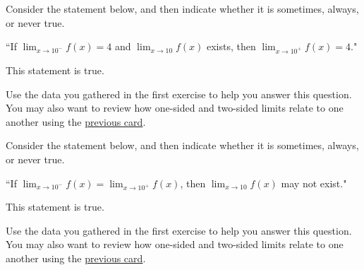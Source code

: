 \documentclass[handout]{ximera}
\begin{document}
\begin{exercise}

Consider the statement below, and then indicate whether it is sometimes, always, or never true.

\begin{center} ``If $\displaystyle\lim_{x\to 10^-} f(x) = 4$ and $\displaystyle\lim_{x\to 10} f(x)$ exists, then $\displaystyle\lim_{x\to 10^+} f(x) = 4.$" \end{center}

This statement is  true.

\begin{hint}

Use the data you gathered in the first exercise to help you answer this question.  You may also want to review how one-sided and two-sided limits relate to one another using the  \href{https://ximera.osu.edu/math160fa17/m160exam1content/whatIsALimit/digInWhatIsALimit}{previous card}.
\end{hint}

\end{exercise}

\begin{exercise}

Consider the statement below, and then indicate whether it is sometimes, always, or never true.

\begin{center} ``If $\displaystyle\lim_{x\to 10^-} f(x) = \displaystyle\lim_{x\to 10^+} f(x)$, then $\displaystyle\lim_{x\to 10} f(x)$ may not exist." \end{center}

This statement is  true.

\begin{hint}

Use the data you gathered in the first exercise to help you answer this question.  You may also want to review how one-sided and two-sided limits relate to one another using the \href{https://ximera.osu.edu/math160fa17/m160exam1content/whatIsALimit/digInWhatIsALimit}{previous card}.

\end{hint} 

\end{exercise}
\end{document}
